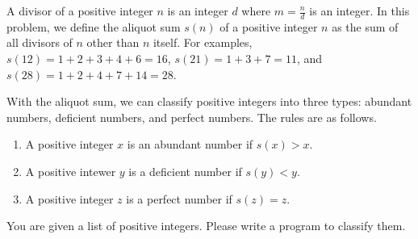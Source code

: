 A divisor of a positive integer $n$ is an integer $d$ where $m=\frac{n}{d}$ 
is an integer. 
In this problem, we define the aliquot sum $s(n)$ of a positive integer $n$ 
as the sum of all divisors of $n$ other than $n$ itself. 
For examples, $s(12)=1+2+3+4+6=16$, $s(21)=1+3+7=11$, and $s(28)=1+2+4+7+14=28$.

With the aliquot sum, we can classify positive integers into three types: 
abundant numbers, deficient numbers, and perfect numbers.
The rules are as follows.
\begin{enumerate}
\item A positive integer $x$ is an abundant number if $s(x)>x$.
\item A positive intewer $y$ is a deficient number if $s(y)<y$.
\item A positive integer $z$ is a perfect number if $s(z)=z$.
\end{enumerate}

You are given a list of positive integers. 
Please write a program to classify them.
